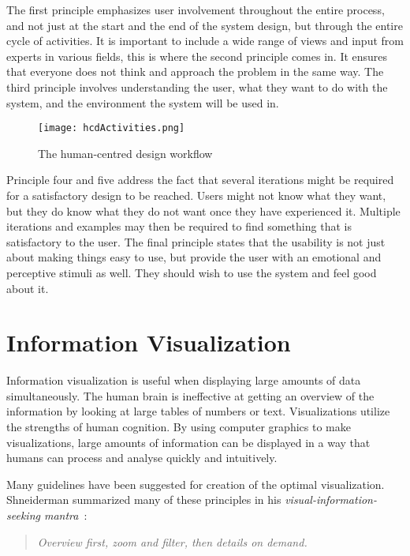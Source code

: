 The first principle emphasizes user involvement throughout the entire process, and not just at the start and the end of the system design, but through the entire cycle of activities. It is important to include a wide range of views and input from experts in various fields, this is where the second principle comes in. It ensures that everyone does not think and approach the problem in the same way. The third principle involves understanding the user, what they want to do with the system, and the environment the system will be used in.

\begin{figure}[h!]
	\centering
		\texttt{[image: hcdActivities.png]}
		\caption[ISO 9241-210 workflow]{The human-centred design workflow}
		\label{fig:hcdActivities}
\end{figure}

Principle four and five address the fact that several iterations might be required for a satisfactory design to be reached. Users might not know what they want, but they do know what they do not want once they have experienced it. Multiple iterations and examples may then be required to find something that is satisfactory to the user. The final principle states that the usability is not just about making things easy to use, but provide the user with an emotional and perceptive stimuli as well. They should wish to use the system and feel good about it.

\section{Information Visualization}
Information visualization is useful when displaying large amounts of data simultaneously. The human brain is ineffective at getting an overview of the information by looking at large tables of numbers or text. Visualizations utilize the strengths of human cognition. By using computer graphics to make visualizations, large amounts of information can be displayed in a way that humans can process and analyse quickly and intuitively.

Many guidelines have been suggested for creation of the optimal visualization. Shneiderman summarized many of these principles in his \emph{visual-information-seeking mantra}~\cite{shneiderman}:

\begin{quote}
\textit{Overview first, zoom and filter, then details on demand.}
\end{quote}

